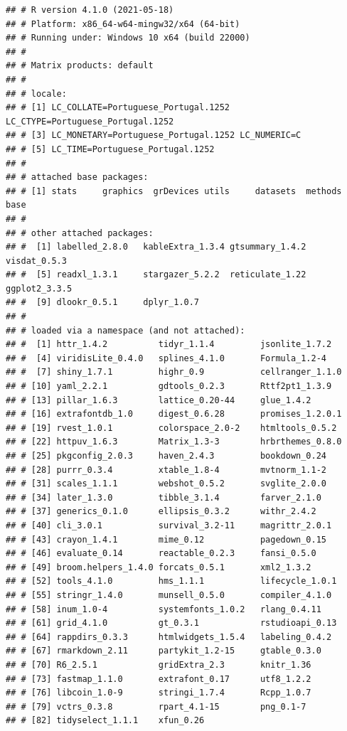 \documentclass[
  12pt,
]{article}
\begin{document}
\begin{verbatim}
## # R version 4.1.0 (2021-05-18) 
## # Platform: x86_64-w64-mingw32/x64 (64-bit) 
## # Running under: Windows 10 x64 (build 22000) 
## #  
## # Matrix products: default 
## #  
## # locale: 
## # [1] LC_COLLATE=Portuguese_Portugal.1252  LC_CTYPE=Portuguese_Portugal.1252    
## # [3] LC_MONETARY=Portuguese_Portugal.1252 LC_NUMERIC=C                         
## # [5] LC_TIME=Portuguese_Portugal.1252     
## #  
## # attached base packages: 
## # [1] stats     graphics  grDevices utils     datasets  methods   base      
## #  
## # other attached packages: 
## #  [1] labelled_2.8.0   kableExtra_1.3.4 gtsummary_1.4.2  visdat_0.5.3     
## #  [5] readxl_1.3.1     stargazer_5.2.2  reticulate_1.22  ggplot2_3.3.5    
## #  [9] dlookr_0.5.1     dplyr_1.0.7      
## #  
## # loaded via a namespace (and not attached): 
## #  [1] httr_1.4.2          tidyr_1.1.4         jsonlite_1.7.2      
## #  [4] viridisLite_0.4.0   splines_4.1.0       Formula_1.2-4       
## #  [7] shiny_1.7.1         highr_0.9           cellranger_1.1.0    
## # [10] yaml_2.2.1          gdtools_0.2.3       Rttf2pt1_1.3.9      
## # [13] pillar_1.6.3        lattice_0.20-44     glue_1.4.2          
## # [16] extrafontdb_1.0     digest_0.6.28       promises_1.2.0.1    
## # [19] rvest_1.0.1         colorspace_2.0-2    htmltools_0.5.2     
## # [22] httpuv_1.6.3        Matrix_1.3-3        hrbrthemes_0.8.0    
## # [25] pkgconfig_2.0.3     haven_2.4.3         bookdown_0.24       
## # [28] purrr_0.3.4         xtable_1.8-4        mvtnorm_1.1-2       
## # [31] scales_1.1.1        webshot_0.5.2       svglite_2.0.0       
## # [34] later_1.3.0         tibble_3.1.4        farver_2.1.0        
## # [37] generics_0.1.0      ellipsis_0.3.2      withr_2.4.2         
## # [40] cli_3.0.1           survival_3.2-11     magrittr_2.0.1      
## # [43] crayon_1.4.1        mime_0.12           pagedown_0.15       
## # [46] evaluate_0.14       reactable_0.2.3     fansi_0.5.0         
## # [49] broom.helpers_1.4.0 forcats_0.5.1       xml2_1.3.2          
## # [52] tools_4.1.0         hms_1.1.1           lifecycle_1.0.1     
## # [55] stringr_1.4.0       munsell_0.5.0       compiler_4.1.0      
## # [58] inum_1.0-4          systemfonts_1.0.2   rlang_0.4.11        
## # [61] grid_4.1.0          gt_0.3.1            rstudioapi_0.13     
## # [64] rappdirs_0.3.3      htmlwidgets_1.5.4   labeling_0.4.2      
## # [67] rmarkdown_2.11      partykit_1.2-15     gtable_0.3.0        
## # [70] R6_2.5.1            gridExtra_2.3       knitr_1.36          
## # [73] fastmap_1.1.0       extrafont_0.17      utf8_1.2.2          
## # [76] libcoin_1.0-9       stringi_1.7.4       Rcpp_1.0.7          
## # [79] vctrs_0.3.8         rpart_4.1-15        png_0.1-7           
## # [82] tidyselect_1.1.1    xfun_0.26
\end{verbatim}
\end{document}

